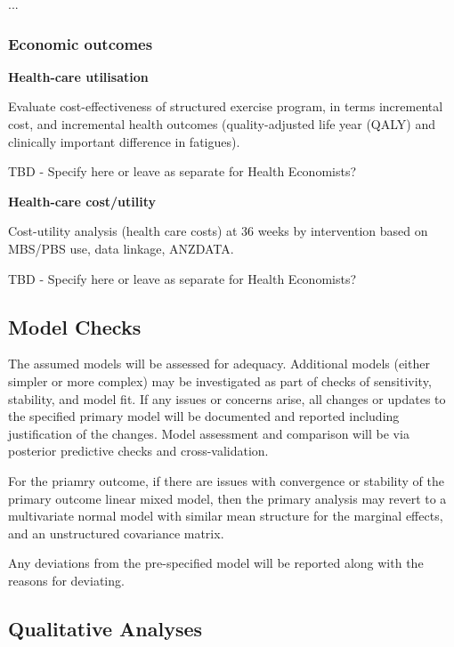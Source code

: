 \documentclass[
]{article}
\begin{document}
...

\hypertarget{economic-outcomes}{%
  \subsubsection{Economic outcomes}\label{economic-outcomes}}

\textbf{Health-care utilisation}

Evaluate cost-effectiveness of structured exercise program, in terms incremental cost, and incremental health outcomes (quality-adjusted life year (QALY) and clinically important difference in fatigues).

TBD - Specify here or leave as separate for Health Economists?

\textbf{Health-care cost/utility}

Cost-utility analysis (health care costs) at 36 weeks by intervention based on MBS/PBS use, data linkage, ANZDATA.

TBD - Specify here or leave as separate for Health Economists?


\hypertarget{model-checks}{
\subsection{Model Checks}\label{model-checks}}

The assumed models will be assessed for adequacy.
Additional models (either simpler or more complex) may be investigated as part of checks of sensitivity, stability, and model fit.
If any issues or concerns arise, all changes or updates to the specified primary model will be documented and reported including justification of the changes.
Model assessment and comparison will be via posterior predictive checks and cross-validation.

For the priamry outcome, if there are issues with convergence or stability of the primary outcome linear mixed model, 
then the primary analysis may revert to a multivariate normal model with similar mean structure for the marginal effects, and an unstructured covariance matrix.

Any deviations from the pre-specified model will be reported along with the reasons for deviating.

\hypertarget{qualitative-analyses}{%
  \subsection{Qualitative Analyses}\label{qualitative-analyses}}
\end{document}
